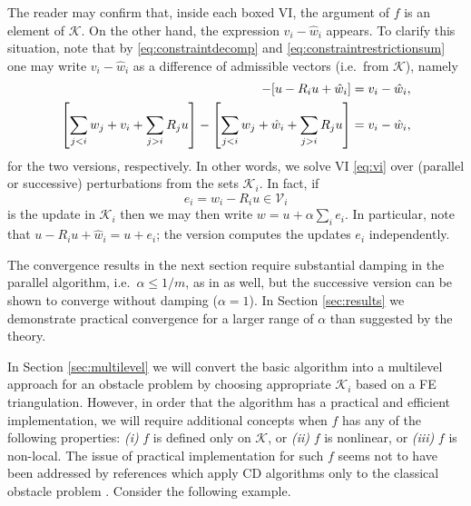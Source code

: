 \documentclass[letterpaper,final,12pt,reqno]{amsart}
\theoremstyle{cstyle}
\theoremstyle{dstyle}
\numberwithin{equation}{section}
\numberwithin{figure}{section}
\numberwithin{table}{section}
\numberwithin{theorem}{section}
\newcommand{\cK}{\mathcal{K}}
\newcommand{\cV}{\mathcal{V}}
\begin{document}
The reader may confirm that, inside each boxed VI, the argument of $f$ is an element of $\cK$.  On the other hand, the expression $v_i - \hat w_i$ appears.  To clarify this situation, note that by \eqref{eq:constraintdecomp} and \eqref{eq:constraintrestrictionsum} one may write $v_i - \hat w_i$ as a difference of admissible vectors (i.e.~from $\cK$), namely
\begin{align*}
[u - R_i u + v_i] - [u - R_i u + \hat w_i] &= v_i - \hat w_i, \label{eq:admissibledifference} \\
\left[\sum_{j<i} w_j + v_i + \sum_{j>i} R_j u\right] - \left[\sum_{j<i} w_j + \hat w_i + \sum_{j>i} R_j u\right] &= v_i - \hat w_i,  \notag
\end{align*}
for the two versions, respectively.  In other words, we solve VI \eqref{eq:vi} over (parallel or successive) perturbations from the sets $\cK_i$.  In fact, if
\begin{equation}
e_i = \hat w_i - R_i u \in \cV_i \label{eq:ithupdate}
\end{equation}
is the update in $\cK_i$ then we may then write $w = u + \alpha \sum_i e_i$.  In particular, note that $u - R_i u + \hat w_i = u + e_i$; the  version computes the updates $e_i$ independently.

The convergence results in the next section require substantial damping in the parallel algorithm, i.e.~$\alpha \le 1/m$, as in \cite{Tai2003} as well, but the successive version can be shown to converge without damping ($\alpha=1$).  In Section \ref{sec:results} we demonstrate practical convergence for a larger range of $\alpha$ than suggested by the theory.  %

In Section \ref{sec:multilevel} we will convert the basic algorithm into a multilevel approach for an obstacle problem by choosing appropriate $\cK_i$ based on a FE triangulation.  However, in order that the algorithm has a practical and efficient implementation, we will require additional concepts when $f$ has any of the following properties: \emph{(i)} $f$ is defined only on $\cK$, or \emph{(ii)} $f$ is nonlinear, or \emph{(iii)} $f$ is non-local.  The issue of practical implementation for such $f$ seems not to have been addressed by references which apply CD algorithms only to the classical obstacle problem \cite[in particular]{GraeserKornhuber2009,Tai2003}.  Consider the following example.
\end{document}
